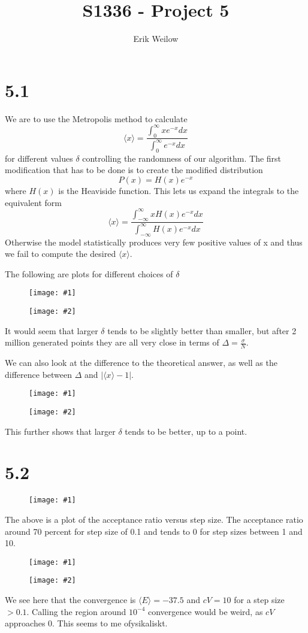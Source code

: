 \documentclass[11pt]{article}
\title{S1336 - Project 5}
\author{Erik Weilow}
\newcommand{\doublefigure}[2]{
\begin{figure}[H]
  \centering
  \begin{minipage}{0.45\textwidth}
    \centering
    \texttt{[image: \#1]}
  \end{minipage}
  \begin{minipage}{0.45\textwidth}
    \centering
    \texttt{[image: \#2]}
  \end{minipage}
\end{figure}
}
\newcommand{\singlewiderfigure}[1]{
\begin{figure}[H]
  \centering
  \begin{minipage}{0.6\textwidth}
    \centering
    \texttt{[image: \#1]}
  \end{minipage}
\end{figure}
}
\begin{document}
\maketitle
\newpage

\section*{5.1}

We are to use the Metropolis method to calculate
$$
\langle x \rangle = \frac{\int_0^\infty{x e^{-x} dx}}{\int_0^\infty{e^{-x} dx}}
$$
for different values $\delta$ controlling the randomness of our algorithm. The first modification that has to be done is to create the modified distribution
$$
P(x) = H(x) e^{-x}
$$
where $H(x)$ is the Heaviside function. This lets us expand the integrals to the equivalent form
$$
\langle x \rangle = \frac{\int_{-\infty}^\infty{x H(x) e^{-x} dx}}{\int_{-\infty}^\infty{H(x)e^{-x} dx}}
$$
Otherwise the model statistically produces very few positive values of x and thus we fail to compute the desired $\langle x \rangle$.

The following are plots for different choices of $\delta$
\doublefigure{./plots/5_1/mean.png}{./plots/5_1/delta.png}

It would seem that larger $\delta$ tends to be slightly better than smaller, but after 2 million generated points they are all very close in terms of $\Delta = \frac{\sigma}{N}$.

We can also look at the difference to the theoretical answer, as well as the difference between $\Delta$ and $|\langle x \rangle - 1|$.
\doublefigure{./plots/5_1/difference.png}{./plots/5_1/diff.png}

This further shows that larger $\delta$ tends to be better, up to a point.

\section*{5.2}
\singlewiderfigure{./plots/5_2/acceptance.png}
The above is a plot of the acceptance ratio versus step size. The acceptance ratio around 70 percent for step size of 0.1 and tends to 0 for step sizes between 1 and 10.


\doublefigure{./plots/5_2/convergence.png}{./plots/5_2/cV.png}

We see here that the convergence is $\langle E \rangle = -37.5$ and $cV = 10$ for a step size $>0.1$. Calling the region around $10^{-4}$ convergence would be weird, as $cV$ approaches 0. This seems to me ofysikaliskt.
\end{document}

